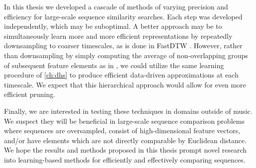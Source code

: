 In this thesis we developed a cascade of methods of varying precision and efficiency for large-scale sequence similarity searches.
Each step was developed independently, which may be suboptimal.
A better approach may be to simultaneously learn more and more efficient representations by repeatedly downsampling to coarser timescales, as is done in FastDTW \cite{salvador2007toward}.
However, rather than downsampling by simply computing the average of non-overlapping groups of subsequent feature elements as in \cite{salvador2007toward}, we could utilize the same learning procedure of \cref{ch:dhs} to produce efficient data-driven approximations at each timescale.
We expect that this hierarchical approach would allow for even more efficient pruning.

Finally, we are interested in testing these techniques in domains outside of music.
We suspect they will be beneficial in large-scale sequence comparison problems where sequences are oversampled, consist of high-dimensional feature vectors, and/or have elements which are not directly comparable by Euclidean distance.
We hope the results and methods proposed in this thesis prompt novel research into learning-based methods for efficiently and effectively comparing sequences.
